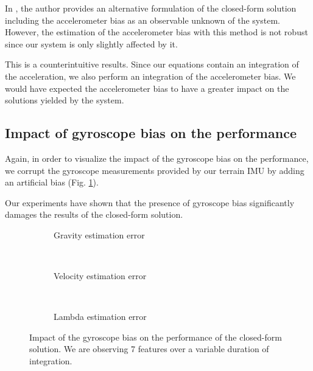 \documentclass[letterpaper, 10 pt, conference]{ieeeconf}  %
\begin{document}
In \cite{Martinelli2014}, the author provides an alternative formulation of the closed-form solution including the accelerometer bias as an observable unknown of the system.
However, the estimation of the accelerometer bias with this method is not robust since our system is only slightly affected by it.

This is a counterintuitive results. Since our equations contain an integration of the acceleration, we also perform an integration of the accelerometer bias.
We would have expected the accelerometer bias to have a greater impact on the solutions yielded by the system.



\subsection{Impact of gyroscope bias on the performance}
Again, in order to visualize the impact of the gyroscope bias on the performance,
we corrupt the gyroscope measurements provided by our terrain IMU by adding an artificial bias (Fig. \ref{fig:biasGyroCF}).

Our experiments have shown that the presence of gyroscope bias significantly damages the results of the closed-form solution.

\begin{figure}
        \centering

        \begin{subfigure}[b]{0.5\columnwidth}
                \resizebox{\columnwidth}{!}{}
                \caption{Gravity estimation error}

        \end{subfigure}%
        ~ %
        \begin{subfigure}[b]{0.5\columnwidth}
                \resizebox{\columnwidth}{!}{}
                \caption{Velocity estimation error}

        \end{subfigure}
        ~ %
        \begin{subfigure}[b]{0.5\columnwidth}
                \resizebox{\columnwidth}{!}{}
                \caption{Lambda estimation error}

        \end{subfigure}
        \caption{Impact of the gyroscope bias on the performance of the closed-form solution. We are observing 7 features over a variable duration of integration. \label{fig:biasGyroCF}}
\end{figure}
\end{document}
